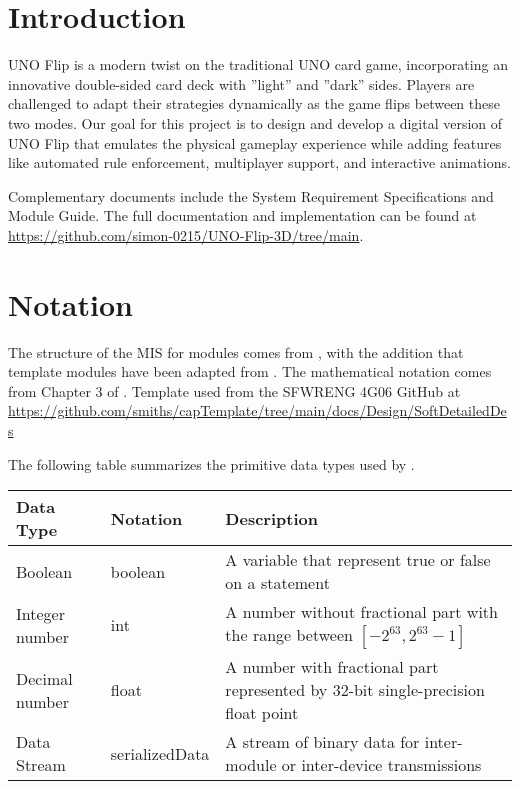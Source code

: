 \documentclass[12pt, titlepage]{article}
\begin{document}
\newpage

\tableofcontents

\newpage


\section{Introduction}

UNO Flip is a modern twist on the traditional UNO card game, incorporating an innovative double-sided card deck with ”light” and ”dark” sides. Players are challenged to adapt their strategies dynamically as the game flips between these two modes. Our goal for this project is to design and develop a digital version of UNO Flip that emulates the physical gameplay experience while adding features like automated rule enforcement, multiplayer support, and interactive animations.

Complementary documents include the System Requirement Specifications and Module Guide. The full documentation and implementation can be found at \url{https://github.com/simon-0215/UNO-Flip-3D/tree/main}. 


\section{Notation}



The structure of the MIS for modules comes from \citet{HoffmanAndStrooper1995},
with the addition that template modules have been adapted from
\cite{GhezziEtAl2003}.  The mathematical notation comes from Chapter 3 of
\citet{HoffmanAndStrooper1995}. Template used from the SFWRENG 4G06 GitHub at \url{https://github.com/smiths/capTemplate/tree/main/docs/Design/SoftDetailedDes} 

The following table summarizes the primitive data types used by . 

\begin{center}
\renewcommand{\arraystretch}{1.2}
\noindent 
\begin{tabular}{l l p{7.5cm}} 
\toprule 
\textbf{Data Type} & \textbf{Notation} & \textbf{Description}\\ 
\midrule
Boolean & boolean & A variable that represent true or false on a statement \\
Integer number & int & A number without fractional part with the range between $[-2^{63}, 2^{63}-1]$\\
Decimal number & float & A number with fractional part represented by 32-bit single-precision float point\\
Data Stream & serializedData & A stream of binary data for inter-module or inter-device transmissions\\
\bottomrule
\end{tabular} 
\end{center}
\end{document}

